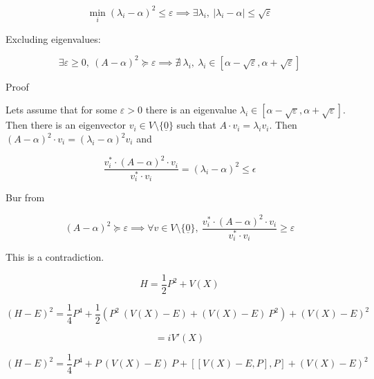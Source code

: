 \documentclass{article}
\theoremstyle{definition}
\begin{document}
\begin{equation}
\min_{i} (\lambda_i-\alpha)^2 \le \varepsilon
\implies
\exists \lambda_i, \ |\lambda_i-\alpha| \le \sqrt{\varepsilon}
\end{equation}

Excluding eigenvalues:

\begin{equation}
    \exists \varepsilon \ge 0 , \ 
    (A-\alpha)^2 \succcurlyeq \varepsilon
    \implies
    \nexists \ \lambda_i, \ \lambda_i \in [\alpha-\sqrt{\varepsilon},\alpha+\sqrt{\varepsilon}]
\end{equation}

Proof

Lets assume that for some $\varepsilon>0$ there is an eigenvalue $\lambda_i \in [\alpha-\sqrt{\varepsilon},\alpha+\sqrt{\varepsilon}]$. Then there is an eigenvector $v_i \in V \setminus \{\underline{0}\}$ such that $A\cdot v_i=\lambda_i v_i$.
Then $(A-\alpha)^2\cdot v_i = (\lambda_i-\alpha)^2 v_i$ and

\begin{equation}
    \frac{v^*_i \cdot (A-\alpha)^2 \cdot v_i}{v^*_i \cdot v_i} = (\lambda_i-\alpha)^2 \le \epsilon
\end{equation}

Bur from

\begin{equation}
    (A-\alpha)^2 \succcurlyeq \varepsilon
    \implies
    \forall v \in V \setminus \{\underline{0}\} , \ 
    \frac{v^*_i \cdot (A-\alpha)^2 \cdot v_i}{v^*_i \cdot v_i} 
    \ge 
    \varepsilon
\end{equation}

This is a contradiction.

\begin{equation}
    H = \frac{1}{2} P^2 + V(X)
\end{equation}

\begin{equation}
    (H-E)^2 = \frac{1}{4} P^4 + \frac{1}{2}(P^2 \ (V(X)-E)+ (V(X)-E) \ P^2) + (V(X)-E)^2
\end{equation}

\begin{equation}
    [V(X),P] = i V'(X)
\end{equation}

\begin{equation}
    (H-E)^2 = \frac{1}{4} P^4 + P \ (V(X)-E) \  P + [[V(X)-E,P],P] + (V(X)-E)^2
\end{equation}
\end{document}
